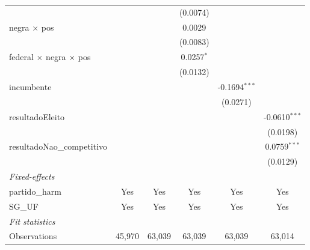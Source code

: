 \begin{tabular}{lccccc}
                                             &                       &                        & (0.0074)        &                    &   \\   
   negra $\times$ pos                        &                       &                        & 0.0029          &                    &   \\   
                                             &                       &                        & (0.0083)        &                    &   \\   
   federal $\times$ negra $\times$ pos       &                       &                        & 0.0257$^{*}$    &                    &   \\   
                                             &                       &                        & (0.0132)        &                    &   \\   
   incumbente                                &                       &                        &                 & -0.1694$^{***}$    &   \\   
                                             &                       &                        &                 & (0.0271)           &   \\   
   resultadoEleito                           &                       &                        &                 &                    & -0.0610$^{***}$\\   
                                             &                       &                        &                 &                    & (0.0198)\\   
   resultadoNao\_competitivo                 &                       &                        &                 &                    & 0.0759$^{***}$\\   
                                             &                       &                        &                 &                    & (0.0129)\\   
   \midrule
   \emph{Fixed-effects}\\
   partido\_harm                             & Yes                   & Yes                    & Yes             & Yes                & Yes\\  
   SG\_UF                                    & Yes                   & Yes                    & Yes             & Yes                & Yes\\  
   \midrule
   \emph{Fit statistics}\\
   Observations                              & 45,970                & 63,039                 & 63,039          & 63,039             & 63,014\\  

\end{tabular}
